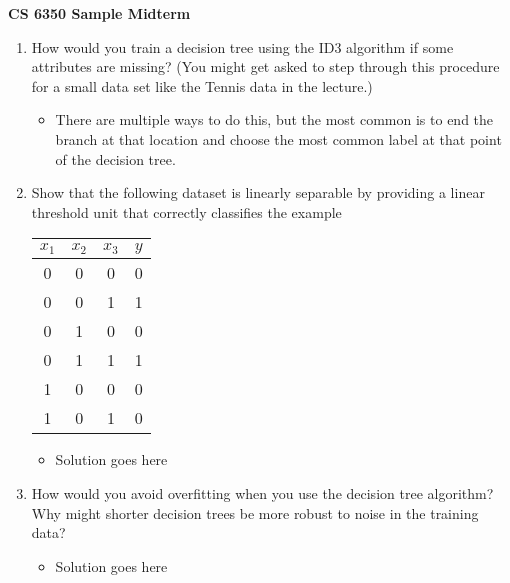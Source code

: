 \documentclass{article}
\begin{document}
\begin{center}
{\huge \bf CS 6350 Sample Midterm}
\end{center}

\begin{enumerate}
\item How would you train a decision tree using the ID3 algorithm if some attributes are missing? (You might get asked to step through this procedure for a small data set like the Tennis data in the lecture.)

	\begin{itemize}
	\item There are multiple ways to do this, but the most common is to end the branch at that location and choose the most common label at that point of the decision tree.
	\end{itemize}


\item Show that the following dataset is linearly separable by providing a linear threshold unit that correctly classifies the example
\begin{center}
\begin{tabular}{|ccc | c |}
\hline
$x_{1}$ & $x_{2}$ & $x_{3}$ & $y$\\
\hline
0 & 0 & 0 & 0\\
0 & 0 & 1 & 1\\
0 & 1 & 0 & 0\\
0 & 1 & 1 & 1\\
1 & 0 & 0 & 0\\
1 & 0 & 1 & 0\\
\hline
\end{tabular}
\end{center}

	\begin{itemize}
	\item Solution goes here
	\end{itemize}


\item How would you avoid overfitting when you use the decision tree algorithm? Why might shorter decision trees be more robust to noise in the training data?

	\begin{itemize}
	\item Solution goes here
	\end{itemize}




\end{enumerate}
\end{document}

